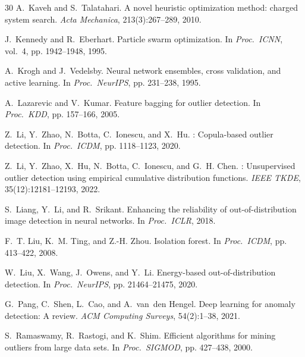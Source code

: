 \documentclass{article}
\begin{document}
\begin{thebibliography}{30}
A.~Kaveh and S.~Talatahari.
\newblock A novel heuristic optimization method: charged system search.
\newblock \emph{Acta Mechanica}, 213(3):267--289, 2010.

J.~Kennedy and R.~Eberhart.
\newblock Particle swarm optimization.
\newblock In \emph{Proc.\ ICNN}, vol.~4, pp. 1942--1948, 1995.

A.~Krogh and J.~Vedelsby.
\newblock Neural network ensembles, cross validation, and active learning.
\newblock In \emph{Proc.\ NeurIPS}, pp. 231--238, 1995.

A.~Lazarevic and V.~Kumar.
\newblock Feature bagging for outlier detection.
\newblock In \emph{Proc.\ KDD}, pp. 157--166, 2005.

Z.~Li, Y.~Zhao, N.~Botta, C.~Ionescu, and X.~Hu.
: Copula-based outlier detection.
\newblock In \emph{Proc.\ ICDM}, pp. 1118--1123, 2020.

Z.~Li, Y.~Zhao, X.~Hu, N.~Botta, C.~Ionescu, and G.~H. Chen.
: Unsupervised outlier detection using empirical cumulative distribution functions.
\newblock \emph{IEEE TKDE}, 35(12):12181--12193, 2022.

S.~Liang, Y.~Li, and R.~Srikant.
\newblock Enhancing the reliability of out-of-distribution image detection in neural networks.
\newblock In \emph{Proc.\ ICLR}, 2018.

F.~T. Liu, K.~M. Ting, and Z.-H. Zhou.
\newblock Isolation forest.
\newblock In \emph{Proc.\ ICDM}, pp. 413--422, 2008.

W.~Liu, X.~Wang, J.~Owens, and Y.~Li.
\newblock Energy-based out-of-distribution detection.
\newblock In \emph{Proc.\ NeurIPS}, pp. 21464--21475, 2020.

G.~Pang, C.~Shen, L.~Cao, and A.~van~den Hengel.
\newblock Deep learning for anomaly detection: A review.
\newblock \emph{ACM Computing Surveys}, 54(2):1--38, 2021.

S.~Ramaswamy, R.~Rastogi, and K.~Shim.
\newblock Efficient algorithms for mining outliers from large data sets.
\newblock In \emph{Proc.\ SIGMOD}, pp. 427--438, 2000.


\end{thebibliography}
\end{document}
